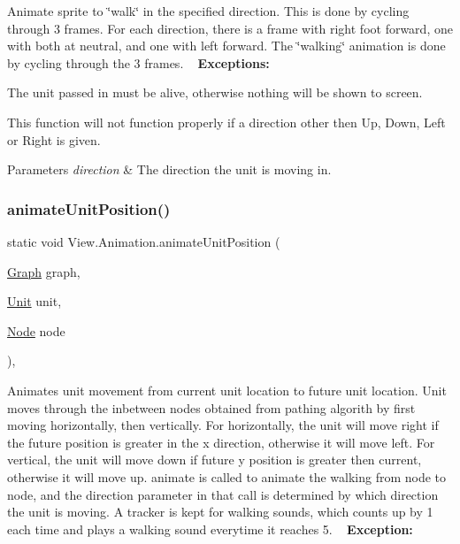 Animate sprite to \char`\"{}walk\char`\"{} in the specified direction. This is done by cycling through 3 frames. For each direction, there is a frame with right foot forward, one with both at neutral, and one with left forward. The \char`\"{}walking\char`\"{} animation is done by cycling through the 3 frames. ~\newline
{\bfseries Exceptions\+:} ~\newline

\begin{DoxyItemize}
\item The unit passed in must be alive, otherwise nothing will be shown to screen.
\item This function will not function properly if a direction other then Up, Down, Left or Right is given. 
\begin{DoxyParams}{Parameters}
{\em direction} & The direction the unit is moving in. \\
\hline
\end{DoxyParams}

\end{DoxyItemize}\hypertarget{class_view_1_1_animation_a008dc7bbb7014aca9c1284613b25f356}{}\label{class_view_1_1_animation_a008dc7bbb7014aca9c1284613b25f356} 
\subsubsection{\texorpdfstring{animate\+Unit\+Position()}{animateUnitPosition()}}
{\footnotesize\ttfamily static void View.\+Animation.\+animate\+Unit\+Position (\begin{DoxyParamCaption}\item[{\hyperlink{class_model_1_1_map_module_1_1_graph}{Graph}}]{graph,  }\item[{\hyperlink{interface_model_1_1_unit_module_1_1_unit}{Unit}}]{unit,  }\item[{\hyperlink{class_model_1_1_map_module_1_1_node}{Node}}]{node }\end{DoxyParamCaption})\hspace{0.3cm}{\ttfamily [inline]}, {\ttfamily [static]}}

Animates unit movement from current unit location to future unit location. Unit moves through the inbetween nodes obtained from pathing algorith by first moving horizontally, then vertically. For horizontally, the unit will move right if the future position is greater in the x direction, otherwise it will move left. For vertical, the unit will move down if future y position is greater then current, otherwise it will move up. animate is called to animate the walking from node to node, and the direction parameter in that call is determined by which direction the unit is moving. A tracker is kept for walking sounds, which counts up by 1 each time and plays a walking sound everytime it reaches 5. ~\newline
 {\bfseries Exception\+:} ~\newline

